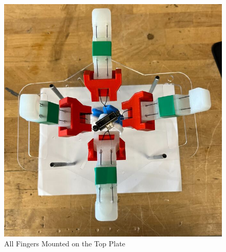 \documentclass{article}
\begin{document}
\begin{figure}[H]
    \centering
    \includegraphics[width=0.5\linewidth]{PCBImages/AttachingFingers/attaching_fingers_5.jpg}
    \caption{All Fingers Mounted on the Top Plate}
    \label{fig:all_fingers_mounted}
\end{figure}
\end{document}
